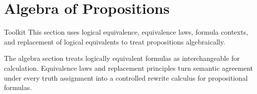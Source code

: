 \section{Algebra of Propositions}

\begin{toolkitbox}{Toolkit}
This section uses logical equivalence, equivalence laws, formula contexts, and
replacement of logical equivalents to treat propositions algebraically.
\end{toolkitbox}

\begin{remark*}[Exposition]
The algebra section treats logically equivalent formulas as interchangeable
for calculation. Equivalence laws and replacement principles turn semantic
agreement under every truth assignment into a controlled rewrite calculus for
propositional formulas.
\end{remark*}



